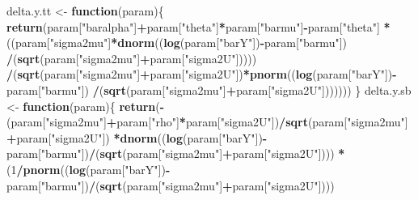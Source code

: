 \documentclass[]{book}
\newenvironment{Shaded}{\begin{snugshade}}{\end{snugshade}}
\newcommand{\KeywordTok}[1]{\textcolor[rgb]{0.13,0.29,0.53}{\textbf{#1}}}
\newcommand{\DecValTok}[1]{\textcolor[rgb]{0.00,0.00,0.81}{#1}}
\newcommand{\StringTok}[1]{\textcolor[rgb]{0.31,0.60,0.02}{#1}}
\newcommand{\ControlFlowTok}[1]{\textcolor[rgb]{0.13,0.29,0.53}{\textbf{#1}}}
\newcommand{\OperatorTok}[1]{\textcolor[rgb]{0.81,0.36,0.00}{\textbf{#1}}}
\newcommand{\NormalTok}[1]{#1}
\theoremstyle{definition}
\theoremstyle{definition}
\theoremstyle{definition}
\theoremstyle{remark}
\begin{document}
\begin{Shaded}
\begin{Highlighting}[]
\NormalTok{delta.y.tt <-}\StringTok{ }\ControlFlowTok{function}\NormalTok{(param)\{}
  \KeywordTok{return}\NormalTok{(param[}\StringTok{"baralpha"}\NormalTok{]}\OperatorTok{+}\NormalTok{param[}\StringTok{"theta"}\NormalTok{]}\OperatorTok{*}\NormalTok{param[}\StringTok{"barmu"}\NormalTok{]}\OperatorTok{-}\NormalTok{param[}\StringTok{"theta"}\NormalTok{]}
         \OperatorTok{*}\NormalTok{((param[}\StringTok{"sigma2mu"}\NormalTok{]}\OperatorTok{*}\KeywordTok{dnorm}\NormalTok{((}\KeywordTok{log}\NormalTok{(param[}\StringTok{"barY"}\NormalTok{])}\OperatorTok{-}\NormalTok{param[}\StringTok{"barmu"}\NormalTok{])}
                                    \OperatorTok{/}\NormalTok{(}\KeywordTok{sqrt}\NormalTok{(param[}\StringTok{"sigma2mu"}\NormalTok{]}\OperatorTok{+}\NormalTok{param[}\StringTok{"sigma2U"}\NormalTok{]))))}
           \OperatorTok{/}\NormalTok{(}\KeywordTok{sqrt}\NormalTok{(param[}\StringTok{"sigma2mu"}\NormalTok{]}\OperatorTok{+}\NormalTok{param[}\StringTok{"sigma2U"}\NormalTok{])}\OperatorTok{*}\KeywordTok{pnorm}\NormalTok{((}\KeywordTok{log}\NormalTok{(param[}\StringTok{"barY"}\NormalTok{])}\OperatorTok{-}\NormalTok{param[}\StringTok{"barmu"}\NormalTok{])}
                                                            \OperatorTok{/}\NormalTok{(}\KeywordTok{sqrt}\NormalTok{(param[}\StringTok{"sigma2mu"}\NormalTok{]}\OperatorTok{+}\NormalTok{param[}\StringTok{"sigma2U"}\NormalTok{]))))))}
\NormalTok{\}}
\NormalTok{delta.y.sb <-}\StringTok{ }\ControlFlowTok{function}\NormalTok{(param)\{}
  \KeywordTok{return}\NormalTok{(}\OperatorTok{-}\NormalTok{(param[}\StringTok{"sigma2mu"}\NormalTok{]}\OperatorTok{+}\NormalTok{param[}\StringTok{"rho"}\NormalTok{]}\OperatorTok{*}\NormalTok{param[}\StringTok{"sigma2U"}\NormalTok{])}\OperatorTok{/}\KeywordTok{sqrt}\NormalTok{(param[}\StringTok{"sigma2mu"}\NormalTok{]}\OperatorTok{+}\NormalTok{param[}\StringTok{"sigma2U"}\NormalTok{])}
         \OperatorTok{*}\KeywordTok{dnorm}\NormalTok{((}\KeywordTok{log}\NormalTok{(param[}\StringTok{"barY"}\NormalTok{])}\OperatorTok{-}\NormalTok{param[}\StringTok{"barmu"}\NormalTok{])}\OperatorTok{/}\NormalTok{(}\KeywordTok{sqrt}\NormalTok{(param[}\StringTok{"sigma2mu"}\NormalTok{]}\OperatorTok{+}\NormalTok{param[}\StringTok{"sigma2U"}\NormalTok{])))}
         \OperatorTok{*}\NormalTok{(}\DecValTok{1}\OperatorTok{/}\KeywordTok{pnorm}\NormalTok{((}\KeywordTok{log}\NormalTok{(param[}\StringTok{"barY"}\NormalTok{])}\OperatorTok{-}\NormalTok{param[}\StringTok{"barmu"}\NormalTok{])}\OperatorTok{/}\NormalTok{(}\KeywordTok{sqrt}\NormalTok{(param[}\StringTok{"sigma2mu"}\NormalTok{]}\OperatorTok{+}\NormalTok{param[}\StringTok{"sigma2U"}\NormalTok{])))}

\end{Highlighting}
\end{Shaded}
\end{document}
